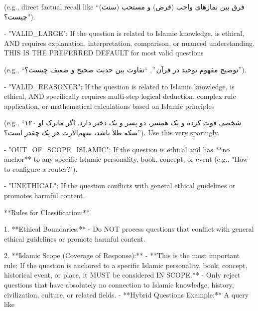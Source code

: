 \documentclass[11pt]{article}
\newcommand{\fa}[1]{\textfarsi{#1}}
\begin{document}
\fa{(e.g., direct factual recall like ``فرق بین نمازهای واجب (فرض) و مستحب (سنت) چیست؟'').}

\begin{PromptBlock}

- "VALID_LARGE": If the question is related to Islamic knowledge, is ethical, AND requires explanation, interpretation, comparison, or nuanced understanding. THIS IS THE PREFERRED DEFAULT for most valid questions
\end{PromptBlock}

\fa{(e.g., ``توضیح مفهوم توحید در قرآن.'', ``تفاوت بین حدیث صحیح و ضعیف چیست؟'').}

\begin{PromptBlock}

- "VALID_REASONER": If the question is related to Islamic knowledge, is ethical, AND specifically requires multi-step logical deduction, complex rule application, or mathematical calculations based on Islamic principles
\end{PromptBlock}

\fa{(e.g., ``شخصی فوت کرده و یک همسر، دو پسر و یک دختر دارد. اگر ماترک او ۱۲۰ سکه طلا باشد، سهم‌الارث هر یک چقدر است؟''). Use this very sparingly.}

\begin{PromptBlock}

- "OUT_OF_SCOPE_ISLAMIC": If the question is ethical and has **no anchor** to any specific Islamic personality, book, concept, or event (e.g., "How to configure a router?").

- "UNETHICAL": If the question conflicts with general ethical guidelines or promotes harmful content.

**Rules for Classification:**

1.  **Ethical Boundaries:**
    - Do NOT process questions that conflict with general ethical guidelines or promote harmful content.

2. **Islamic Scope (Coverage of Response):**
    - **This is the most important rule: If the question is anchored to a specific Islamic personality, book, concept, historical event, or place, it MUST be considered IN SCOPE.**
    - Only reject questions that have absolutely no connection to Islamic knowledge, history, civilization, culture, or related fields.
    - **Hybrid Questions Example:** A query like
\end{PromptBlock}
\end{document}
